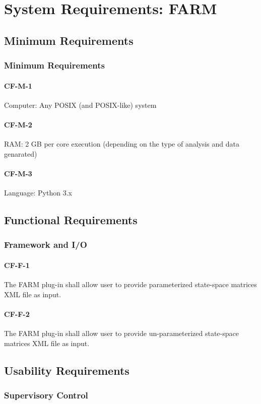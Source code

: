 \section{System Requirements: FARM}
\subsection{Minimum Requirements}
\subsubsection{Minimum Requirements}
\paragraph{CF-M-1} 
Computer: Any POSIX (and POSIX-like) system
\paragraph{CF-M-2} 
RAM: 2 GB per core execution (depending on the type of analysis and data genarated)
\paragraph{CF-M-3} 
Language: Python 3.x
\subsection{Functional Requirements}
\subsubsection{Framework and I/O}
\paragraph{CF-F-1} 
The FARM plug-in shall allow user to provide parameterized state-space matrices XML file as input.
\paragraph{CF-F-2} 
The FARM plug-in shall allow user to provide un-parameterized state-space matrices XML file as input.
\subsection{Usability Requirements}
\subsubsection{Supervisory Control}

